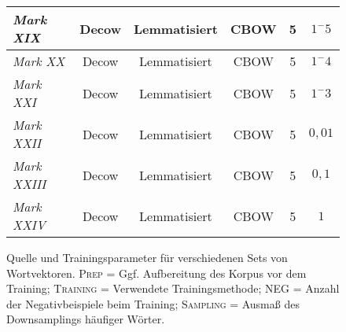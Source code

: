 \begin{figure}[h]
\begin{tabular}{l||c|c|c|c|c}
  \hline
  \emph{Mark XIX} & Decow & Lemmatisiert & CBOW & 5 & $1^-5$ \\
  \hline
  \emph{Mark XX} & Decow & Lemmatisiert & CBOW & 5 & $1^-4$ \\
  \hline
  \emph{Mark XXI} & Decow & Lemmatisiert & CBOW & 5 & $1^-3$ \\
  \hline
  \emph{Mark XXII} & Decow & Lemmatisiert & CBOW & 5 & $0,01$ \\
  \hline
  \emph{Mark XXIII} & Decow & Lemmatisiert & CBOW & 5 & $0,1$ \\
  \hline
  \emph{Mark XXIV} & Decow & Lemmatisiert & CBOW & 5 & $1$ \\
\end{tabular}
\caption[Quelle und Trainingsparameter für Wortvektoren]{Quelle und Trainingsparameter für verschiedenen Sets von Wortvektoren.
\textsc{Prep} = Ggf. Aufbereitung des Korpus vor dem Training; \textsc{Training} = Verwendete Trainingsmethode; \textsc{NEG} = Anzahl der
Negativbeispiele beim Training; \textsc{Sampling} = Ausmaß des Downsamplings häufiger Wörter.}
\end{figure}
